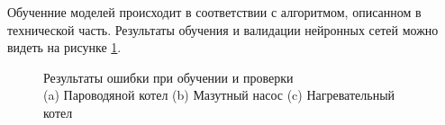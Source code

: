 Обученние моделей происходит в соответствии с алгоритмом, описанном в
технической часть. Результаты обучения и валидации нейронных сетей можно видеть
на рисунке \ref{fig:test:plot:learning}.

\begin{figure}[H]
  \centering
  \caption{Результаты ошибки при обучении и проверки\\(a) Пароводяной котел (b)
  Мазутный насос (c) Нагревательный котел}\label{fig:test:plot:learning}
\end{figure}

